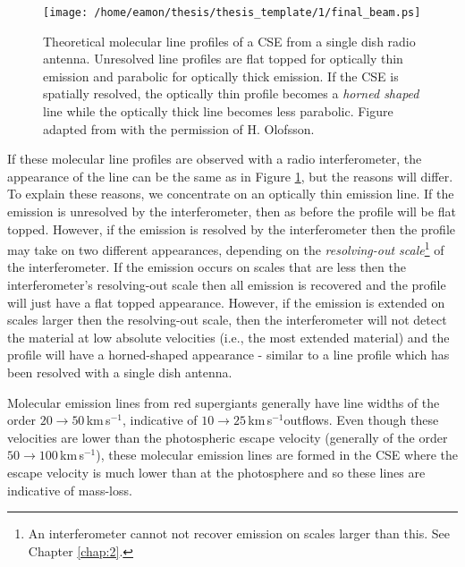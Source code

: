 \begin{figure}[t!]
\centering 
          \texttt{[image: /home/eamon/thesis/thesis\_template/1/final\_beam.ps]}
\caption[Theoretical molecular line profiles]{Theoretical molecular line profiles of a CSE from a single dish radio antenna. Unresolved line profiles are flat topped for optically thin emission and parabolic for optically thick emission. If the CSE is spatially resolved, the optically thin profile becomes a \textit{horned shaped} line while the optically thick line becomes less parabolic. Figure adapted from \cite{dalgarno_1987} with the permission of H. Olofsson.}
\label{fig:1.8.5}
\end{figure}

If these molecular line profiles are observed with a radio interferometer, the appearance of the line can be the same as in Figure \ref{fig:1.8.5}, but the reasons will differ. To explain these reasons, we concentrate on an optically thin emission line. If the emission is unresolved by the interferometer, then as before the profile will be flat topped. However, if the emission is resolved by the interferometer then the profile may take on two different appearances, depending on the \textit{resolving-out scale}\footnote{ An interferometer cannot not recover emission on scales larger than this. See Chapter \ref{chap:2}.} of the interferometer. If the emission occurs on scales that are less then the interferometer's resolving-out scale then all emission is recovered and the profile will just have a flat topped appearance. However, if the emission is extended on scales larger then the resolving-out scale, then the interferometer will not detect the material at low absolute velocities (i.e., the most extended material) and the profile will have a horned-shaped appearance - similar to a line profile which has been resolved with a single dish antenna.

Molecular emission lines from red supergiants generally have line widths of the order $20\rightarrow 50$\,km\,s$^{-1}$, indicative of $10 \rightarrow 25$\,km\,s$^{-1} $outflows. Even though these velocities are lower than the photospheric escape velocity (generally of the order $50\rightarrow 100$\,km\,s$^{-1}$), these molecular emission lines are formed in the CSE where the escape velocity is much lower than at the photosphere and so these lines are indicative of mass-loss.

